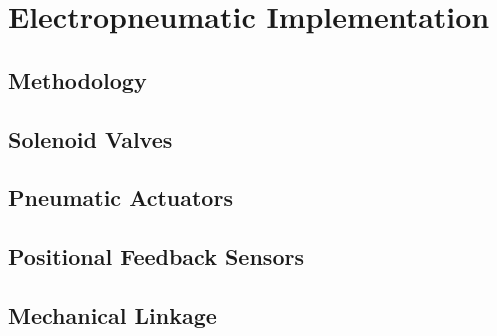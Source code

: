 \section{Electropneumatic Implementation}


\subsection{Methodology}


\subsection{Solenoid Valves}


\subsection{Pneumatic Actuators}


\subsection{Positional Feedback Sensors}


\subsection{Mechanical Linkage}